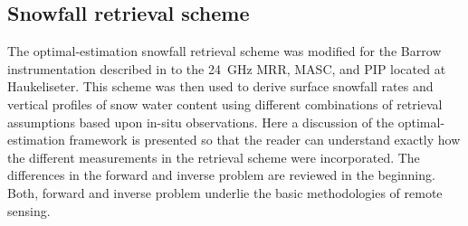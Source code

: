 \subsection{Snowfall retrieval scheme}\label{sec:ret_scheme}

The optimal-estimation snowfall retrieval scheme was modified for the Barrow instrumentation described in \citet{cooper_variational_2017} to the \SI{24}{\giga\hertz} MRR, MASC, and PIP located at Haukeliseter. This scheme was then used to derive surface snowfall rates and vertical profiles of snow water content using different combinations of retrieval assumptions based upon in-situ observations. Here a discussion of the optimal-estimation framework is presented so that the reader can understand exactly how the different measurements in the retrieval scheme were incorporated. The differences in the forward and inverse problem are reviewed in the beginning. Both, forward and inverse problem underlie the basic methodologies of remote sensing.
\\
\\
